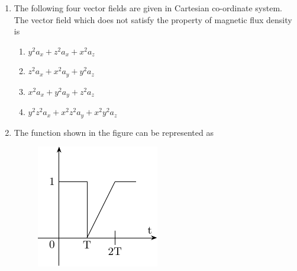 \documentclass[journal]{IEEEtran}
\begin{document}
\begin{enumerate}
               \begin{enumerate}
	       \end{enumerate}	
       \item The following four vector fields are given in Cartesian co-ordinate system. The vector field which
does not satisfy the property of magnetic flux density is
		\begin{enumerate}
			\item $y^2a_x+z^2a_x+x^2a_z$
			\item $z^2a_x+x^2a_y+y^2a_z$
			\item $x^2a_x+y^2a_y+z^2a_z$
			\item $y^2z^2a_x+x^2z^2a_y+x^2y^2a_z$
		\end{enumerate}
	\item  The function shown in the figure can be represented as
		\begin{figure}[h!]
            \centering
            \includegraphics[width=0.3\linewidth]{fig/fig2.pdf}
        \end{figure}


\end{enumerate}
\end{document}
